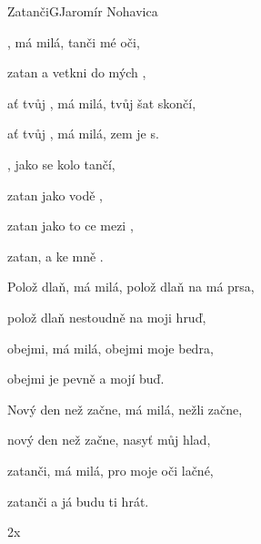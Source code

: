\setcounter{page}{102}
\begin{song}{Zatanči}{G}{Jaromír Nohavica}

\begin{SBVerse}

, má milá, tanči  mé oči,

zatan a vetkni  do mých ,

ať tvůj , má milá,  tvůj šat  skončí,

ať tvůj , má milá, zem je s.

\end{SBVerse}

\begin{SBChorus}

, jako se kolo  tančí,

zatan jako  vodě ,

zatan jako to ce mezi ,

zatan, a  ke mně .

\end{SBChorus}

\begin{SBVerse}

Polož dlaň, má milá, polož dlaň na má prsa,

polož dlaň nestoudně na moji hruď,

obejmi, má milá, obejmi moje bedra,

obejmi je pevně a mojí buď.

\end{SBVerse}

\begin{SBChorus}

\end{SBChorus}

\begin{SBVerse}

Nový den než začne, má milá, nežli začne,

nový den než začne, nasyť můj hlad,

zatanči, má milá, pro moje oči lačné,

zatanči a já budu ti hrát.

\end{SBVerse}

\begin{SBChorus}
2x
\end{SBChorus}

\end{song}

\clearpage
